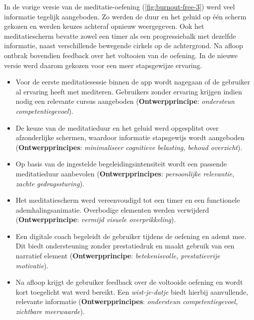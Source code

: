 In de vorige versie van de meditatie-oefening (\ref{fig:burnout-free-3}) werd veel informatie tegelijk aangeboden. Zo werden de duur en het geluid op één scherm gekozen en werden keuzes achteraf opnieuw weergegeven. Ook het meditatiescherm bevatte zowel een timer als een progressiebalk met dezelfde informatie, naast verschillende bewegende cirkels op de achtergrond. Na afloop ontbrak bovendien feedback over het voltooien van de oefening. In de nieuwe versie werd daarom gekozen voor een meer stapsgewijze ervaring.

\vspace{1em}

{\small
    \begin{itemize}
        \item Voor de eerste meditatiesessie binnen de app wordt nagegaan of de gebruiker al ervaring heeft met mediteren. Gebruikers zonder ervaring krijgen indien nodig een relevante cursus aangeboden (\textbf{Ontwerpprincipe}: \textit{ondersteun competentiegevoel}).
        
        \item De keuze van de meditatieduur en het geluid werd opgesplitst over afzonderlijke schermen, waardoor informatie stapsgewijs wordt aangeboden (\textbf{Ontwerpprincipes}: \textit{minimaliseer cognitieve belasting, behoud overzicht}).
        
        \item Op basis van de ingestelde begeleidingsintensiteit wordt een passende meditatieduur aanbevolen (\textbf{Ontwerpprincipes}: \textit{persoonlijke relevantie, zachte gedragssturing}).
        
        \item Het meditatiescherm werd vereenvoudigd tot een timer en een functionele ademhalingsanimatie. Overbodige elementen werden verwijderd (\textbf{Ontwerpprincipe}: \textit{vermijd visuele overprikkeling}).
        
        \item Een digitale coach begeleidt de gebruiker tijdens de oefening en ademt mee. Dit biedt ondersteuning zonder prestatiedruk en maakt gebruik van een narratief element (\textbf{Ontwerpprincipe}: \textit{betekenisvolle, prestatievrije motivatie}).
        
        \item Na afloop krijgt de gebruiker feedback over de voltooide oefening en wordt kort toegelicht wat werd bereikt. Een \textit{wist-je-datje} biedt hierbij aanvullende, relevante informatie (\textbf{Ontwerpprincipes}: \textit{ondersteun competentiegevoel, zichtbare meerwaarde}).
    \end{itemize}
}

